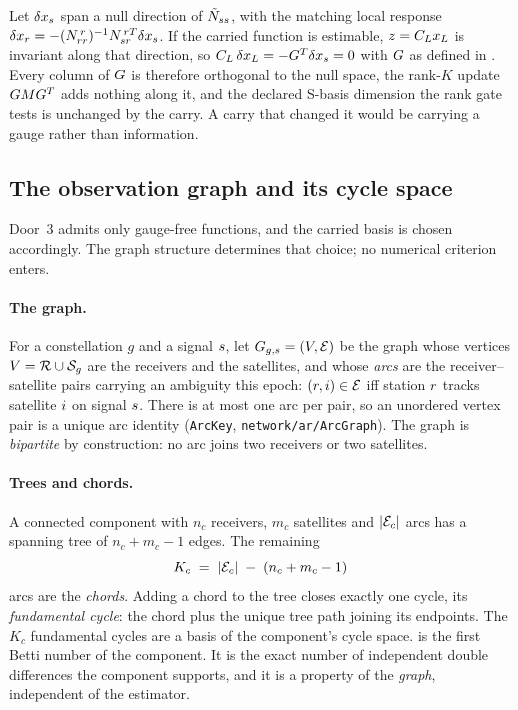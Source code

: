 \documentclass[main.tex]{subfiles}
\begin{document}
\begin{remark}
Let $\delta x_s$ span a null direction of $\tilde{N}_{ss}$, with the
matching local response $\delta x_{r} =
-(N_{rr}^{\,r})^{-1}N_{sr}^{\,rT}\delta x_s$.  If the carried
function is estimable, $z = C_Lx_L$ is invariant along that
direction, so $C_L\,\delta x_L = -G^{T}\delta x_s = 0$
with $G$ as defined in .  Every column
of $G$ is therefore orthogonal to the null space, the rank-$K$
update $GMG^{T}$ adds nothing along it, and the declared
S-basis dimension the rank gate tests is unchanged by the carry.  A
carry that changed it would be carrying a gauge rather than
information.
\end{remark}

\subsection{The observation graph and its cycle space}
\label{sec:net-carry-cycles}

Door~3 admits only gauge-free functions, and the carried basis is
chosen accordingly.  The graph structure determines that choice; no
numerical criterion enters.

\paragraph{The graph.}
For a constellation $g$ and a signal $s$, let $G_{g,s} = (V,
\mathcal{E})$ be the graph whose vertices $V = \mathcal{R} \cup \mathcal{S}_{g}$ are
the receivers and the satellites, and whose \emph{arcs} are the
receiver--satellite pairs carrying an ambiguity this epoch:
$(r,i) \in \mathcal{E}$ iff station $r$ tracks satellite $i$ on
signal $s$.  There is at most one arc per pair, so an unordered
vertex pair is a unique arc identity (\texttt{ArcKey},
\texttt{network/ar/ArcGraph}).  The graph is \emph{bipartite} by
construction: no arc joins two receivers or two satellites.

\paragraph{Trees and chords.}
A connected component with $n_c$ receivers, $m_c$ satellites and
$|\mathcal{E}_c|$ arcs has a spanning tree of $n_c + m_c - 1$ edges.  The
remaining
\begin{equation}
K_c \;=\; |\mathcal{E}_c| \;-\; (n_c + m_c - 1)
\label{eq:carry-chordcount}
\end{equation}
arcs are the \emph{chords}.  Adding a chord to the tree closes exactly
one cycle, its \emph{fundamental cycle}: the chord plus the unique
tree path joining its endpoints.  The $K_c$ fundamental cycles are a
basis of the component's cycle space.   is
the first Betti number of the component.  It is the exact number of
independent double differences the component supports, and it is a
property of the \emph{graph}, independent of the estimator.
\end{document}
